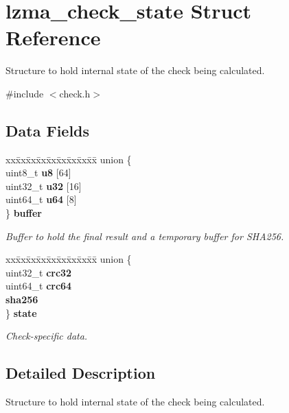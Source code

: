 \section{lzma\-\_\-check\-\_\-state Struct Reference}
\label{structlzma__check__state}


Structure to hold internal state of the check being calculated.  




{\ttfamily \#include $<$check.\-h$>$}

\subsection*{Data Fields}
\begin{DoxyCompactItemize}
\item 
\begin{tabbing}
xx\=xx\=xx\=xx\=xx\=xx\=xx\=xx\=xx\=\kill
union \{\\
\>uint8\_t {\bfseries u8} [64]\\
\>uint32\_t {\bfseries u32} [16]\\
\>uint64\_t {\bfseries u64} [8]\\
\} {\bf buffer}\\

\end{tabbing}\begin{DoxyCompactList}\small\item\em Buffer to hold the final result and a temporary buffer for S\-H\-A256. \end{DoxyCompactList}\item 
\begin{tabbing}
xx\=xx\=xx\=xx\=xx\=xx\=xx\=xx\=xx\=\kill
union \{\\
\>uint32\_t {\bfseries crc32}\\
\>uint64\_t {\bfseries crc64}\\
 {\bfseries sha256}\\
\} {\bf state}\\

\end{tabbing}\begin{DoxyCompactList}\small\item\em Check-\/specific data. \end{DoxyCompactList}\end{DoxyCompactItemize}


\subsection{Detailed Description}
Structure to hold internal state of the check being calculated. 

